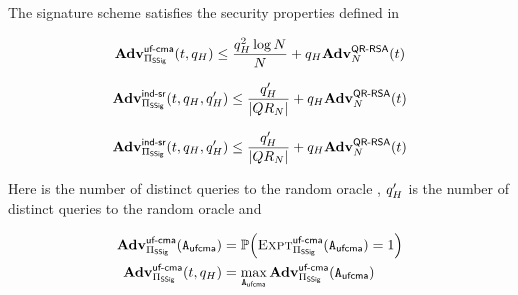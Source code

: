 \begin{theorem}
	\label{thm:unforge}
	The signature scheme \ourSigScheme satisfies the security properties defined in 


	\[
	\mathbf{Adv}^{\scriptsize\textsf{uf-cma}}_{\Pi_{\mathsf{SSig}} }(t, q_H) \le \frac{q_H^2 \log N}{N} + q_H \mathbf{Adv}^{\textsf{QR-RSA}}_{N}(t) 
	\]
	
	\[
	\Advantage{\indsrLabel}{\sigScheme}(\timeBound, 
	\oracleQueries, \oracleQueries') \le   \frac{\oracleQueries' }{\setSize{\qrGroup}}  + \oracleQueries 
	\rsaAdv
	\]

		\[
	\Advantage{\indsrLabel}{\sigScheme}(\timeBound, 
	\oracleQueries, \oracleQueries') \le   \frac{\oracleQueries' }{\setSize{\qrGroup}}  + \oracleQueries 
	\rsaAdv
	\]

Here \oracleQueries is the number of distinct queries to the random oracle \primeRO,  
$q_H'$ is the number of distinct queries to the random oracle \ro and 


   \begin{eqnarray*}
	\Advantage{\ufcmaLabel}{\sigScheme}(\ufcmaAdversary) & = 
	\prob{\Experiment{\ufcmaLabel}{\sigScheme}(\ufcmaAdversary) = 1} \\
	\Advantage{\ufcmaLabel}{\sigScheme}(\timeBound, \oracleQueries) & = \max_{\ufcmaAdversary} 
	\Advantage{\ufcmaLabel}{\sigScheme}(\ufcmaAdversary) 
	\end{eqnarray*}



	
\end{theorem}
\fi 

